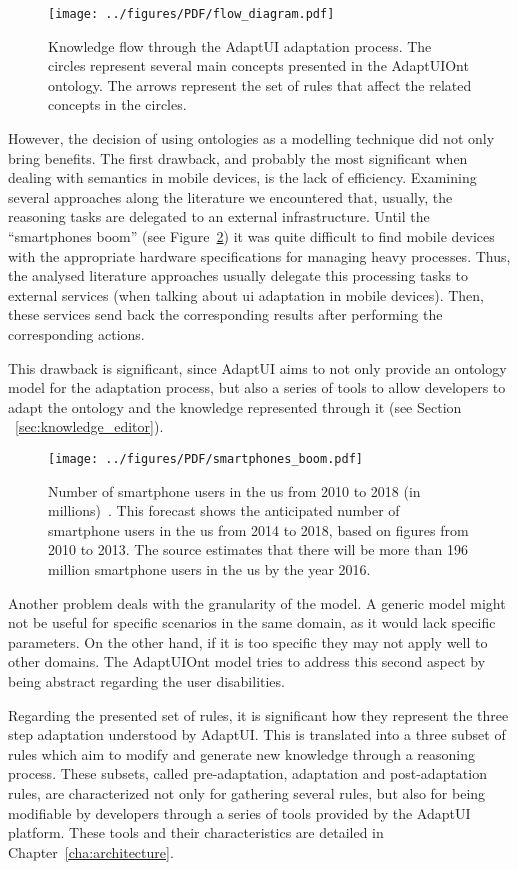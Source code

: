 \begin{figure}
\centering
\texttt{[image: ../figures/PDF/flow\_diagram.pdf]}
\caption{Knowledge flow through the AdaptUI adaptation process. The circles
represent several main concepts presented in the AdaptUIOnt ontology. The arrows
represent the set of rules that affect the related concepts in the circles.}
\label{fig:flow_diagram_2}
\end{figure}

However, the decision of using ontologies as a modelling technique did not only
bring benefits. The first drawback, and probably the most significant when dealing
with semantics in mobile devices, is the lack of efficiency. Examining several
approaches along the literature we encountered that, usually, the reasoning tasks
are delegated to an external infrastructure. Until the ``smartphones boom'' (see
Figure~\ref{fig:smartphones_boom}) it was quite difficult to find mobile devices
with the appropriate hardware specifications for managing heavy processes. Thus,
the analysed literature approaches usually delegate this processing tasks to
external services (when talking about \acs{ui} adaptation in mobile devices). Then,
these services send back the corresponding results after performing the
corresponding actions. 

This drawback is significant, since AdaptUI aims to not only provide an ontology
model for the adaptation process, but also a series of tools to allow developers
to adapt the ontology and the knowledge represented through it (see Section
~\ref{sec:knowledge_editor}).


\begin{figure}
\centering
\texttt{[image: ../figures/PDF/smartphones\_boom.pdf]}
\caption{Number of smartphone users in the \ac{us} from 2010 to 2018 (in
millions)~\citep{smartphones_boom}. This forecast shows the anticipated number
of smartphone users in the \ac{us} from 2014 to 2018, based on figures from 2010 
to 2013. The source estimates that there will be more than 196 million smartphone
users in the \ac{us} by the year 2016.}
\label{fig:smartphones_boom}
\end{figure}

Another problem deals with the granularity of the model. A generic model might
not be useful for specific scenarios in the same domain, as it would lack specific
parameters. On the other hand, if it is too specific they may not apply well to
other domains. The AdaptUIOnt model tries to address this second aspect by being
abstract regarding the user disabilities. 

Regarding the presented set of rules, it is significant how they represent the
three step adaptation understood by AdaptUI. This is translated into a three
subset of rules which aim to modify and generate new knowledge through a reasoning
process. These subsets, called pre-adaptation, adaptation and post-adaptation rules,
are characterized not only for gathering several rules, but also for being modifiable
by developers through a series of tools provided by the AdaptUI platform. These
tools and their characteristics are detailed in Chapter~\ref{cha:architecture}.